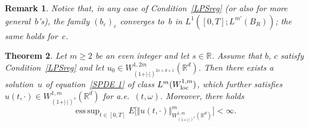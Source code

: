 \documentclass[a4paper,10pt]{article}
\newtheorem{theorem}{Theorem}[section]
\newtheorem{remark}[theorem]{Remark}
\newcommand\1{\mathbbm{1}}
\newcommand{\eps}{\varepsilon}
\newcommand\loc{{\rm loc}}
\DeclareMathOperator*{\esssup}{ess\,sup}
\numberwithin{equation}{section}
\begin{document}
\begin{remark}
\label{b_eps-m-prime-convergence}
Notice that, in any case of Condition~\ref{LPSreg} \textup{(}or also for more general~$b$'s\textup{)}, the family $(b_\eps)_\eps$ converges to~$b$ in $L^1([0,T];L^{m'}(B_R))$; the same holds for~$c$.
\end{remark}

\begin{theorem}
\label{Theo existence regular sol}
Let $m\geq2$ be an even integer and let $s\in\mathbb{R}$. Assume that $b$, $c$ satisfy Condition~\ref{LPSreg} and let
$u_{0}\in W_{(1+ \vert \cdot \vert)^{2s+d+1}}^{1,2m}(\mathbb{R}^{d})$. Then there exists a solution~$u$ of equation~\eqref{SPDE 1} of class $L^{m}(W_{\loc}^{1,m})$, which further satisfies $u(t,\cdot)\in W_{( 1+ \vert \cdot \vert)^{s}}^{1,m}(\mathbb{R}^{d})$ for a.e.~$(t,\omega)$. Moreover, there holds
\begin{equation}
\esssup_{t\in[0,T]}E\Big[  \Vert u(t,\cdot) \Vert_{W_{(1+ \vert \cdot \vert)^{s}}^{1,m}(\mathbb{R}^{d})}^{m}\Big]  <\infty . 
\label{regularity of solution}
\end{equation}
\end{theorem}
\end{document}
